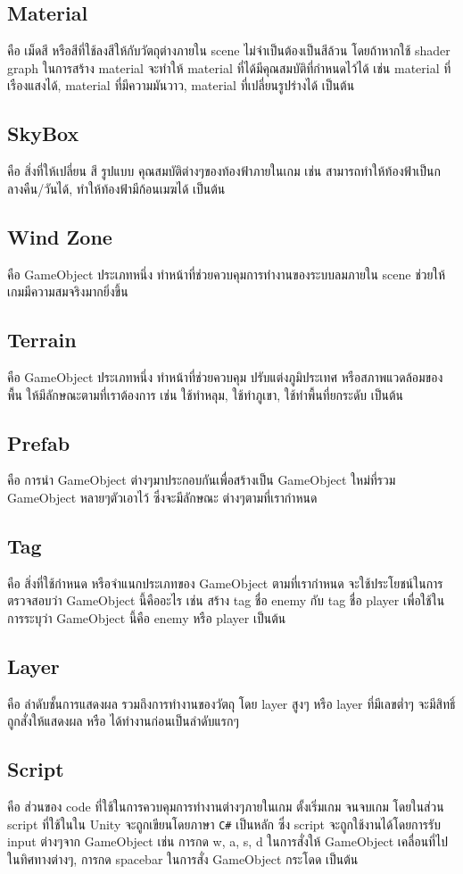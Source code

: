 \subsection{Material}
คือ เม็ดสี หรือสีที่ใช้ลงสีให้กับวัตถุต่างภายใน scene ไม่จำเป็นต้องเป็นสีล้วน โดยถ้าหากใช้ shader graph
ในการสร้าง material จะทำให้ material ที่ได้มีคุณสมบัติที่กำหนดไว้ได้ เช่น material ที่เรืองแสงได้, 
material ที่มีความมันวาว, material ที่เปลี่ยนรูปร่างได้ เป็นต้น
\subsection{SkyBox}
คือ สิ่งที่ให้เปลี่ยน สี รูปแบบ คุณสมบัติต่างๆของท้องฟ้าภายในเกม เช่น สามารถทำให้ท้องฟ้าเป็นกลางคืน/วันได้,
ทำให้ท้องฟ้ามีก้อนเมฆได้ เป็นต้น
\subsection{Wind Zone}
คือ GameObject ประเภทหนึ่ง ทำหน้าที่ช่วยควบคุมการทำงานของระบบลมภายใน scene ช่วยให้เกมมีความสมจริงมากยิ่งขึ้น
\subsection{Terrain}
คือ GameObject ประเภทหนึ่ง ทำหน้าที่ช่วยควบคุม ปรับแต่งภูมิประเทศ หรือสภาพแวดล้อมของพื้น ให้มีลักษณะตามที่เราต้องการ
เช่น ใช้ทำหลุม, ใช้ทำภูเขา, ใช้ทำพื้นที่ยกระดับ เป็นต้น
\subsection{Prefab}
คือ การนำ GameObject ต่างๆมาประกอบกันเพื่อสร้างเป็น GameObject ใหม่ที่รวม GameObject หลายๆตัวเอาไว้ ซึ่งจะมีลักษณะ
ต่างๆตามที่เรากำหนด
\subsection{Tag}
คือ สิ่งที่ใช้กำหนด หรือจำแนกประเภทของ GameObject ตามที่เรากำหนด จะใช้ประโยชน์ในการตรวจสอบว่า GameObject นี้คืออะไร 
เช่น สร้าง tag ชื่อ enemy กับ tag ชื่อ player เพื่อใช้ในการระบุว่า GameObject นี้คือ enemy หรือ player เป็นต้น 
\subsection{Layer}
คือ ลำดับชั้นการแสดงผล รวมถึงการทำงานของวัตถุ โดย layer สูงๆ หรือ layer ที่มีเลขต่ำๆ จะมีสิทธิ์ถูกสั่งให้แสดงผล 
หรือ ได้ทำงานก่อนเป็นลำดับแรกๆ
\subsection{Script}
คือ ส่วนของ code ที่ใช้ในการควบคุมการทำงานต่างๆภายในเกม ตั้งเริ่มเกม จนจบเกม โดยในส่วน script ที่ใช้ในใน Unity
จะถูกเขียนโดยภาษา \texttt{C\#} เป็นหลัก ซึ่ง script จะถูกใช้งานได้โดยการรับ input ต่างๆจาก GameObject เช่น 
การกด w, a, s, d ในการสั่งให้ GameObject เคลื่อนที่ไปในทิศทางต่างๆ, การกด spacebar ในการสั่ง GameObject กระโดด เป็นต้น

